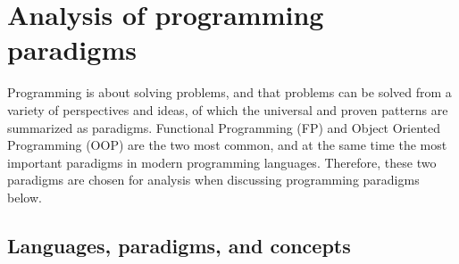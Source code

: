 \section{Analysis of programming paradigms}


Programming is about solving problems,
and that problems can be solved from a variety of perspectives
and ideas, of which the universal and proven patterns are
summarized as paradigms.
Functional Programming (FP) and Object Oriented Programming (OOP)
are the two most common, and at the same time the most important paradigms
in modern programming languages.
Therefore, these two paradigms are chosen for analysis when discussing
programming paradigms below.

\subsection{Languages, paradigms, and concepts}



